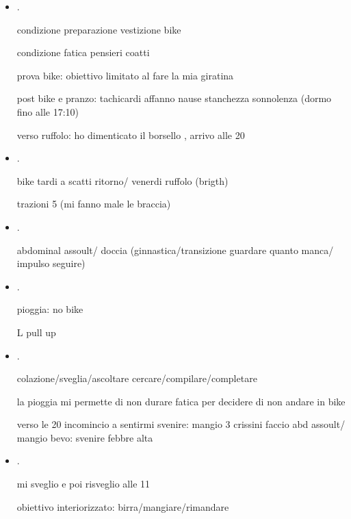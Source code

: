 \begin{itemize}
confusione su nozione interazione: fare quello che voglio io

cosa ho fatto dopo che \'e andata via?

workout dopo le 22 quale (ho dimenticato il ritmo!!)

\item {}.

condizione preparazione vestizione bike 

condizione fatica pensieri coatti


prova bike: obiettivo limitato al fare la mia giratina

post bike e pranzo: tachicardi affanno nause stanchezza sonnolenza (dormo fino alle 17:10)

verso ruffolo: ho dimenticato il borsello , arrivo alle 20



\item {}.

bike tardi a scatti ritorno/ venerdi ruffolo (brigth) 

trazioni 5 (mi fanno male le braccia)

\item {}.

abdominal assoult/ doccia (ginnastica/transizione guardare quanto manca/ impulso seguire)

\item {}.

pioggia: no bike

L pull up


\item {}.

colazione/sveglia/ascoltare cercare/compilare/completare

la pioggia mi permette di non durare fatica per decidere di non andare in bike

verso le 20 incomincio a sentirmi svenire: mangio 3 crissini faccio abd assoult/ mangio bevo: svenire febbre alta 


\item {}.

mi sveglio e poi risveglio alle 11

obiettivo interiorizzato: birra/mangiare/rimandare


\end{itemize}
